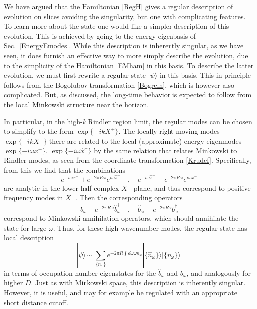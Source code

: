 \documentclass[12pt]{article}
\numberwithin{equation}{section}
\newcommand{\beq}{\begin{equation}}
\newcommand{\eeq}{\end{equation}}
\begin{document}
We have argued that the Hamiltonian \eqref{RegH} gives a regular description of evolution on slices avoiding the singularity, but one with complicating features.  
To learn more about the state one would like a simpler description of this evolution.  This is achieved by going to the energy eigenbasis of Sec.~\ref{EnergyEmodes}. While this description is inherently singular, as we have seen, it does furnish an effective way to more simply describe the evolution, due to the simplicity of the Hamiltonian  \eqref{EMham} in this basis.  To describe the latter evolution, we must first rewrite a regular state $|\psi\rangle$ in this basis.  This in principle follows from the Bogolubov transformation \eqref{Bogreln}, which is however also complicated.  But, as discussed, the long-time behavior is expected to follow from the local Minkowski structure near the horizon.


In particular, in the high-$k$  Rindler region limit, the regular modes can be chosen to simplify to the form $\exp\{-ikX^\pm\}$.  The locally right-moving modes $\exp\{-ikX^-\}$ there are related to the local (approximate) energy eigenmodes $\exp\{-i\omega x^-\}$, $\exp\{-i\omega \hat x^-\}$ by the same relation that relates Minkowski to Rindler modes, as seen from the coordinate transformation \eqref{Krudef}.  Specifically, from this we find that the combinations
\beq
e^{-i\omega x^-} + e^{-2\pi R\omega} e^{i\omega \hat x^-}\quad ,\quad e^{-i\omega \hat x^-} + e^{-2\pi R\omega} e^{i\omega  x^-}
\eeq
are analytic in the lower half complex $X^-$ plane, and thus correspond to positive frequency modes in $X^-$.  Then the corresponding operators
\beq
b_\omega - e^{-2\pi R\omega}\hat b^\dagger_\omega\quad,\quad \hat b_\omega - e^{-2\pi R\omega} b^\dagger_\omega
\eeq
correspond to Minkowski annihilation operators, which should annihilate the state for large $\omega$.  
Thus, for these high-wavenumber modes, the regular state has local description
\beq\label{statereln}
|\psi\rangle \sim\sum_{\{n_\omega\}} e^{-2\pi R\int d\omega \omega n_\omega }| \{\hat n_\omega\} \rangle |\{n_\omega\}\rangle\ 
\eeq
in terms of occupation number eigenstates for the $\hat b_\omega$ and $b_\omega$, and analogously for higher $D$.
Just as with Minkowski space, this description is inherently singular.  However, it is useful, and may for example be regulated with an appropriate short distance cutoff.
\end{document}
